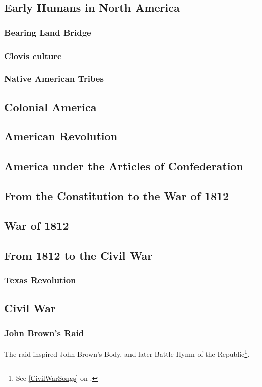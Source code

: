 		\subsection{Early Humans in North America}
			\subsubsection{Bearing Land Bridge}
			\subsubsection{Clovis culture}
			\subsubsection{Native American Tribes}
		\subsection{Colonial America}
		\subsection{American Revolution}
		\subsection{America under the Articles of Confederation}
		\subsection{From the Constitution to the War of 1812}
		\subsection{War of 1812}
		\subsection{From 1812 to the Civil War}
			\subsubsection{Texas Revolution}
		\subsection{Civil War} 
			\subsubsection{John Brown's Raid} 
			The raid inspired John Brown's Body, and later Battle Hymn of the Republic\footnote{See \cref{CivilWarSongs} on  .}.
